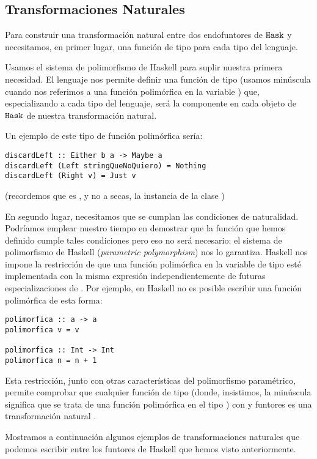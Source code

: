 \subsection{Transformaciones Naturales}
Para construir una transformación natural entre dos endofuntores de
$\texttt{Hask}$  y  necesitamos, en primer lugar, una función de tipo
 para cada tipo  del lenguaje.

Usamos el sistema de polimorfismo de Haskell para suplir nuestra primera
necesidad. El lenguaje nos permite definir una función de
tipo  (usamos  minúscula
cuando nos referimos a una función polimórfica en la variable
) que, especializando a cada tipo del lenguaje, será
la componente en cada objeto de $\texttt{Hask}$ de nuestra transformación natural.

Un ejemplo de este tipo de función polimórfica sería:
\begin{verbatim}
discardLeft :: Either b a -> Maybe a
discardLeft (Left stringQueNoQuiero) = Nothing
discardLeft (Right v) = Just v
\end{verbatim}
(recordemos que es , y no  a secas,
la instancia de la clase )

En segundo lugar, necesitamos que se cumplan las condiciones de
naturalidad. Podríamos emplear nuestro tiempo en demostrar que
la función  que hemos definido cumple
tales condiciones pero eso no
será necesario: el sistema de polimorfismo de
Haskell (\textit{parametric polymorphism}) nos lo garantiza.
Haskell nos impone la restricción de que
una función polimórfica en la variable de tipo 
esté implementada
con la misma expresión independientemente de futuras
especializaciones de . Por ejemplo, en Haskell no es posible
escribir una función polimórfica de esta forma:
\begin{verbatim}
polimorfica :: a -> a
polimorfica v = v

polimorfica :: Int -> Int
polimorfica n = n + 1
\end{verbatim}
Esta restricción, junto con otras características
del polimorfismo paramétrico, permite comprobar que cualquier
función de tipo  (donde, insistimos, la 
minúscula significa que se trata de una función polimórfica
en el tipo )
con  y  funtores es
una transformación natural \cite{theorems-for-free}.

Mostramos a continuación algunos ejemplos de transformaciones naturales
que podemos escribir entre los funtores de Haskell que hemos visto
anteriormente.


